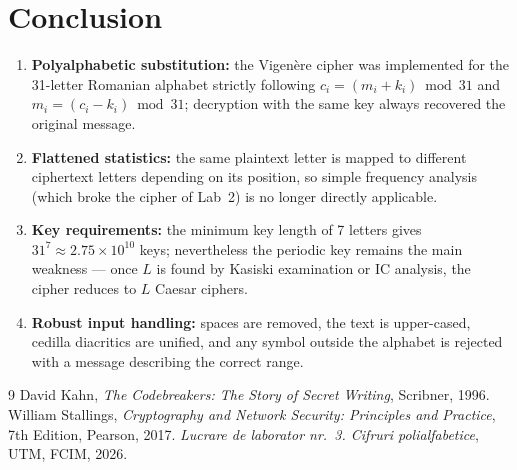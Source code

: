 \documentclass[12pt,a4paper]{article}
\begin{document}
\section{Conclusion}
\begin{enumerate}
  \item \textbf{Polyalphabetic substitution:} the Vigenère cipher was implemented for the
        31-letter Romanian alphabet strictly following
        $c_i=(m_i+k_i)\bmod 31$ and $m_i=(c_i-k_i)\bmod 31$; decryption with the same key always
        recovered the original message.
  \item \textbf{Flattened statistics:} the same plaintext letter is mapped to different
        ciphertext letters depending on its position, so simple frequency analysis (which broke
        the cipher of Lab~2) is no longer directly applicable.
  \item \textbf{Key requirements:} the minimum key length of 7 letters gives
        $31^7\approx2.75\times10^{10}$ keys; nevertheless the periodic key remains the main
        weakness — once $L$ is found by Kasiski examination or IC analysis, the cipher reduces to
        $L$ Caesar ciphers.
  \item \textbf{Robust input handling:} spaces are removed, the text is upper-cased, cedilla
        diacritics are unified, and any symbol outside the alphabet is rejected with a message
        describing the correct range.
\end{enumerate}

\begin{thebibliography}{9}
 David Kahn, \emph{The Codebreakers: The Story of Secret Writing}, Scribner, 1996.
 William Stallings, \emph{Cryptography and Network Security: Principles and
  Practice}, 7th Edition, Pearson, 2017.
 \emph{Lucrare de laborator nr.~3. Cifruri polialfabetice}, UTM, FCIM, 2026.
\end{thebibliography}
\end{document}
